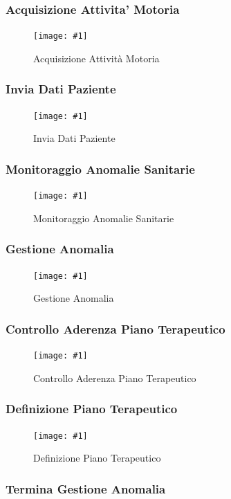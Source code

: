 \documentclass[a4paper,11pt,oneside, table]{article}
\newcommand{\putimage}[4] {
	\begin{figure}[H]
	    \centering
	    \texttt{[image: \#1]}
	    \caption{#2}\label{#3}
	\end{figure}
}
\begin{document}
\subsubsection{Acquisizione Attivita' Motoria}

\putimage{images/Diagramma delle Attivita'/Acquisizione Attivita' Motoria.png}{Acquisizione Attivit\`a Motoria}{png:act:acquisizione-attivita-motoria}{1}

\subsubsection{Invia Dati Paziente}

\putimage{images/Diagramma delle Attivita'/Invia Dati Paziente.png}{Invia Dati Paziente}{png:act:invia-dati-paziente}{1}

\subsubsection{Monitoraggio Anomalie Sanitarie}

\putimage{images/Diagramma delle Attivita'/Monitoraggio Anomalie Sanitarie.png}{Monitoraggio Anomalie Sanitarie}{png:act:monitoraggio-anomalie-sanitarie}{1}

\subsubsection{Gestione Anomalia}

\putimage{images/Diagramma delle Attivita'/Gestione Anomalia.png}{Gestione Anomalia}{png:act:gestione-anomalia}{1}

\subsubsection{Controllo Aderenza Piano Terapeutico}

\putimage{images/Diagramma delle Attivita'/Controllo Aderenza Piano Terapeutico.png}{Controllo Aderenza Piano Terapeutico}{png:act:controllo-aderenza-piano-terapeutico}{1}

\subsubsection{Definizione Piano Terapeutico}

\putimage{images/Diagramma delle Attivita'/Definizione Piano Terapeutico.png}{Definizione Piano Terapeutico}{png:act:definizione-piano-terapeutico}{1}

\subsubsection{Termina Gestione Anomalia}
\end{document}
